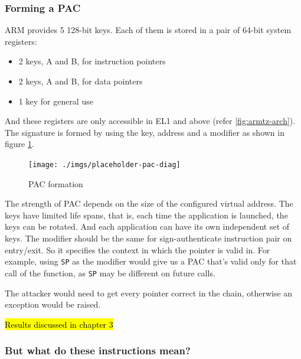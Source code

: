 \documentclass[a4paper, nobind]{templates/ociamthesis}
\providecommand{\tightlist}{%
  \setlength{\itemsep}{0pt}\setlength{\parskip}{0pt}}
\begin{document}
\subsubsection{Forming a PAC}\label{forming-a-pac}

ARM provides 5 128-bit keys. Each of them is stored in a pair of 64-bit system registers:

\begin{itemize}
\tightlist
\item
  2 keys, A and B, for instruction pointers
\item
  2 keys, A and B, for data pointers
\item
  1 key for general use
\end{itemize}

And these registers are only accessible in EL1 and above (refer \ref{fig:armtz-arch}).
The signature is formed by using the key, address and a modifier as shown in figure \ref{fig:pac-diag}.

\begin{figure}

{\centering \texttt{[image: ./imgs/placeholder-pac-diag]} 

}

\caption{PAC formation}\label{fig:pac-diag}
\end{figure}

The strength of PAC depends on the size of the configured virtual address.
The keys have limited life spans, that is, each time the application is launched, the keys can be rotated.
And each application can have its own independent set of keys.
The modifier should be the same for sign-authenticate instruction pair on entry/exit.
So it specifies the context in which the pointer is valid in. For example,
using \texttt{SP} as the modifier would give us a PAC that's valid only for that call of the function,
as \texttt{SP} may be different on future calls.

The attacker would need to get every pointer correct in the chain, otherwise an
exception would be raised.

\hl{Results discussed in chapter 3}

\subsubsection{But what do these instructions mean?}\label{but-what-do-these-instructions-mean}
\end{document}
